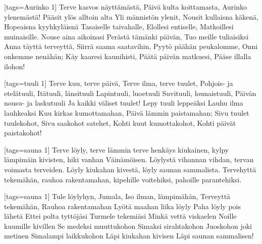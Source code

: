
[tags={Aurinko 1}]
  \beginverse
    Terve kasvos näyttämästä,
    Päivä kulta koittamasta,
    Aurinko ylenemästä!
    Pääsit ylös alltoin alta
    Yli männistön ylenit,
    Nousit kullaisna käkenä,
    Hopeaisna kyyhkyläisnä
    Tasaiselle taivahalle,
    Elollesi entiselle,
    Matkoillesi muinaisille.
  \endverse
  \beginverse
    Nouse aina aikoinasi
    Perästä tämänki päivän,
    Tuo meille tuliaisiksi
    Anna täyttä terveyttä,
    Siirrä saama saatavihin,
    Pyytö päähän peukalomme,
    Onni onkemme nenähän;
    Käy kaaresi kaunihisti,
    Päätä päivän matkuesi,
    Pääse illalla ilohon!
  \endverse
\endsong


[tags={tuuli 1}]
  \beginverse
    Terve kuu, terve päivä,
    Terve ilma, terve tuulet,
    Pohjois- ja etelätuuli,
    Itätuuli, länsituuli
    Lapintuuli, luoetuuli
    Suvituuli, lounaistuuli,
    Päivän nousu- ja laskutuuli
    Ja kaikki väliset tuulet!
    Lepy tuuli leppeäksi
    Lauhu ilma lauhkeaksi
    Kuu kirkas kumottamahan,
    Päivä lämmin paistamahan;
    Sivu tuulet tuulekohot,
    Sivu saakohot satehet,
    Kohti kuut kumottakohot,
    Kohti päivät paistakohot!
  \endverse
\endsong


[tags={sauna 1}]
  \beginverse
    Terve löyly, terve lämmin
    terve henkäys kiukainen,
    kylpy lämpimäin kivisten,
    hiki vanhan Väinämöisen.
    Löylystä vihannan vihdan,
    tervan voimasta terveiden.
  \endverse
  \beginverse
    Löyly kiukahan kivestä,
    löyly saunan sammalista.
    Tervehyttä tekemähän,
    rauhoa rakentamahan,
    kipehille voitehiksi,
    pahoille parantehiksi.  
  \endverse 
\endsong


[tags={sauna 1}]
  \beginverse
    Tule löylyhyn, Jumala, 
    Iso ilman, lämpimähän,
  \endverse
  \beginverse
    Terveyttä tekemähän,
    Rauhoa rakentamahan
  \endverse
  \beginverse
    Lyötä maahan liika löyly
    Paha löyly pois lähetä
  \endverse
  \beginverse
    Ettei polta tyttöjäsi
    Turmele tekemiäsi
  \endverse
  \beginverse
    Minkä vettä viskaelen
    Noille kuumille kivillen
  \endverse
  \beginverse
    Se medeksi muuttukohon
    Simaksi sirahtakohon
  \endverse
  \beginverse
    Juoskohon joki metinen
    Simalampi laikkukohon
  \endverse
  \beginverse
    Läpi kiukahan kivisen
    Läpi saunan sammalisen! 
  \endverse 
\endsong


